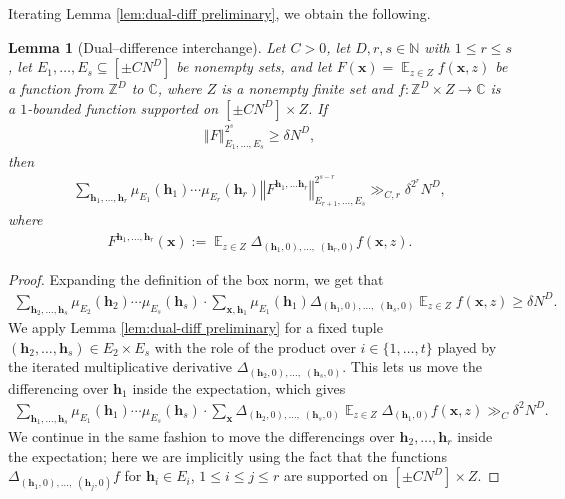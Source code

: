 \documentclass[11pt]{amsart}
\newtheorem{lemma}{Lemma}[section]
\theoremstyle{definition}
\DeclareMathOperator*{\E}{\mathbb{E}}
\newcommand{\C}{{\mathbb C}}
\newcommand{\N}{{\mathbb N}}
\newcommand{\Z}{{\mathbb Z}}
\newcommand{\bh}{{\mathbf{h}}}
\newcommand{\bx}{{\textbf{x}}}
\newcommand{\norm}[1]{\left\Vert #1\right\Vert}
\begin{document}
Iterating Lemma \ref{lem:dual-diff preliminary}, we obtain the following.
\begin{lemma}[Dual--difference interchange]\label{lem:dual-diff}
    Let $C>0$, let $D, r,s\in\N$ with $1 \leq r \leq s$, 
    let $E_1, \ldots, E_s\subseteq [\pm CN^D]$ be nonempty sets, 
and let $F(\bx) = \E_{z\in Z} f(\bx, z)$ be a function from $\Z^D$ to $\C$,
where $Z$ is a nonempty finite set and $f: \Z^D \times Z \to \mathbb{C}$ is a $1$-bounded function supported on $[\pm CN^D]\times Z$. If
\begin{align*}
    \norm{F}_{E_1, \ldots, E_s}^{2^s}\geq \delta N^D,
\end{align*}
then 
\begin{align*}
    \sum_{\bh_1, \ldots, \bh_r}
    \mu_{E_1}(\bh_1)\cdots \mu_{E_r}(\bh_r)\norm{F^{\bh_1, \ldots \bh_r}}^{2^{s-r}}_{E_{r+1}, \ldots, E_s}\gg_{C, r} \delta^{2^r} N^D,
\end{align*}
where 
\begin{align*}
    F^{\bh_1, \ldots, \bh_r}(\bx) := \E_{z\in Z}\Delta_{(\bh_1,0), \ldots,\; (\bh_r,0)}f(\bx, z).
\end{align*}
\end{lemma}
\begin{proof}
    Expanding the definition of the box norm, we get that
    \begin{align*}
        \sum_{\bh_2, \ldots, \bh_s}
        \mu_{E_2}(\bh_2)\cdots \mu_{E_s}(\bh_s)\cdot \sum_{\bx, \bh_1}\mu_{E_1}(\bh_1) \Delta_{(\bh_1,0), \ldots,\; (\bh_s, 0)}\E_{z\in Z}f(\bx, z)\geq \delta N^D.
    \end{align*}
    We apply Lemma \ref{lem:dual-diff preliminary} for a fixed tuple $(\bh_2, \ldots, \bh_s)\in E_2 \times E_s$ with the role of the product over $i\in \{1, \ldots, t\}$ played by the iterated multiplicative derivative $\Delta_{(\bh_2,0), \ldots,\; (\bh_s, 0)}$.  This lets us move the differencing over $\bh_1$ inside the expectation, which gives 
    \begin{align*}
        \sum_{\bh_1, \ldots, \bh_s}
        \mu_{E_1}(\bh_1)\cdots \mu_{E_s}(\bh_s)\cdot \sum_{\bx}\Delta_{(\bh_2,0), \ldots,\; (\bh_s, 0)}\E_{z\in Z}\Delta_{(\bh_1, 0)}f(\bx, z)\gg_C \delta^2 N^D.
    \end{align*}
    We continue in the same fashion to move the differencings over $\bh_2, \ldots, \bh_r$ inside the expectation; here we are implicitly using the fact that the functions $\Delta_{(\bh_1, 0), \ldots,\; (\bh_j, 0)}f$ for $\bh_i\in E_i$, $1\leq i\leq j\leq r$ are supported on $[\pm C N^D]\times Z$.
\end{proof}
\end{document}
